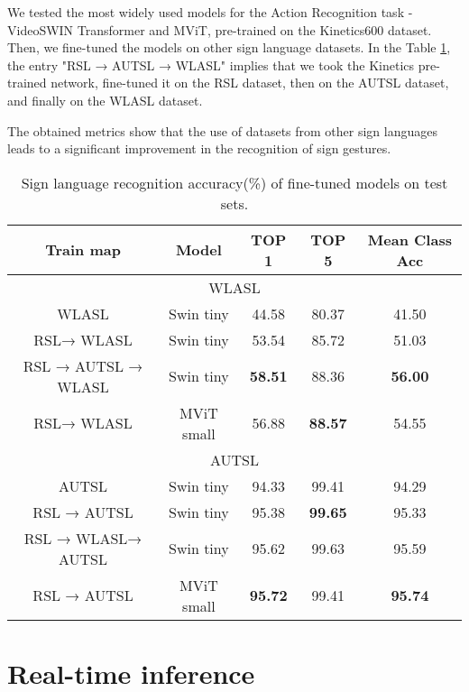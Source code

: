 \documentclass[]{spie}
\begin{document}
We tested the most widely used models for the Action Recognition task - VideoSWIN Transformer\cite{Liu2021} and MViT\cite{Fan2021}, pre-trained on the Kinetics600 dataset. Then, we fine-tuned the models on other sign language datasets. In the Table \ref{tab:results-our-model}, the entry "RSL → AUTSL → WLASL" implies that we took the Kinetics pre-trained network, fine-tuned it on the RSL dataset, then on the AUTSL dataset, and finally on the WLASL dataset. 

The obtained metrics show that the use of datasets from other sign languages leads to a significant improvement in the recognition of sign gestures.


\begin{table}[!ht]
\caption{\label{tab:results-our-model} Sign language recognition accuracy(\%) of fine-tuned models on test sets.}
\begin{center}

\begin{tabular}{|c|c|c|c|c|}
\hline
Train map & Model  & TOP 1  & TOP 5 & Mean Class Acc\\
\hline
\multicolumn{5}{|c|}{WLASL}\\
\hline
WLASL & Swin tiny & 44.58 & 80.37 & 41.50 \\
RSL→ WLASL & Swin tiny & 53.54 & 85.72 & 51.03 \\
RSL → AUTSL → WLASL & Swin tiny & \textbf{58.51} & 88.36 & \textbf{56.00} \\
RSL→ WLASL & MViT small & 56.88& \textbf{88.57} & 54.55 \\
\hline
\multicolumn{5}{|c|}{AUTSL}\\
\hline
AUTSL & Swin tiny & 94.33 & 99.41 & 94.29  \\
RSL → AUTSL & Swin tiny & 95.38 & \textbf{99.65} & 95.33 \\
RSL → WLASL→ AUTSL & Swin tiny & 95.62 &  99.63 & 95.59 \\
RSL → AUTSL & MViT small & \textbf{95.72} & 99.41 & \textbf{95.74} \\


\hline
\end{tabular}
\end{center}
\end{table}
\section{Real-time inference}
\end{document}
